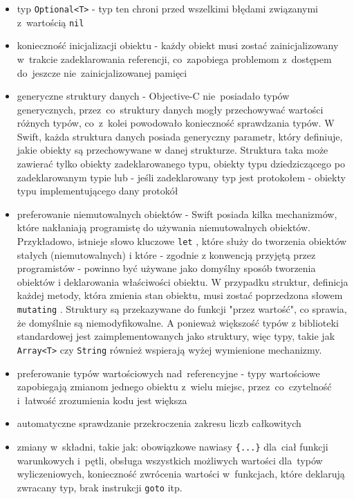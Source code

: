 \documentclass[mgr, shortabstract]{iithesis}
\newcommand{\swiftinline}[1]{
    \texttt{#1}
}
\begin{document}
\begin{itemize}
    \item typ \texttt{Optional<T>} - typ ten chroni przed wszelkimi błędami związanymi z~wartością \texttt{nil}
    \item konieczność inicjalizacji obiektu - każdy obiekt musi zostać zainicjalizowany w~trakcie zadeklarowania referencji, co~zapobiega problemom z~dostępem do~jeszcze nie~zainicjalizowanej pamięci
    \item generyczne struktury danych - Objective-C nie~posiadało typów generycznych, przez~co~struktury danych mogły przechowywać wartości różnych typów, co~z~kolei powodowało konieczność sprawdzania typów. W Swift, każda struktura danych posiada generyczny parametr, który definiuje, jakie obiekty są przechowywane w danej strukturze. Struktura taka może zawierać tylko obiekty zadeklarowanego typu, obiekty typu dziedziczącego po zadeklarowanym typie lub - jeśli zadeklarowany typ jest protokołem - obiekty typu implementującego dany protokół
    \item preferowanie niemutowalnych obiektów - Swift posiada kilka mechanizmów, które nakłaniają programistę do używania niemutowalnych obiektów. Przykładowo, istnieje słowo kluczowe \swiftinline{let}, które służy do tworzenia obiektów stałych (niemutowalnych) i które - zgodnie z konwencją przyjętą przez programistów - powinno być używane jako domyślny sposób tworzenia obiektów i deklarowania właściwości obiektu. W przypadku struktur, definicja każdej metody, która zmienia stan obiektu, musi zostać poprzedzona słowem \swiftinline{mutating}. Struktury są przekazywane do funkcji "przez wartość", co sprawia, że domyślnie są niemodyfikowalne. A ponieważ większość typów z biblioteki standardowej jest zaimplementowanych jako struktury, więc typy, takie jak \swiftinline{Array<T>} czy \swiftinline{String} również wspierają wyżej wymienione mechanizmy.
    \item preferowanie typów wartościowych nad~referencyjne - typy wartościowe zapobiegają zmianom jednego obiektu z~wielu miejsc, przez~co~czytelność i~łatwość zrozumienia kodu jest większa
    \item automatyczne sprawdzanie przekroczenia zakresu liczb całkowitych
    \item zmiany w~składni, takie jak: obowiązkowe nawiasy \texttt{\{...\}} dla~ciał funkcji warunkowych i~pętli, obsługa wszystkich możliwych wartości dla~typów wyliczeniowych, konieczność zwrócenia wartości w~funkcjach, które deklarują zwracany typ, brak instrukcji \texttt{goto} itp.
\end{itemize}
\end{document}
